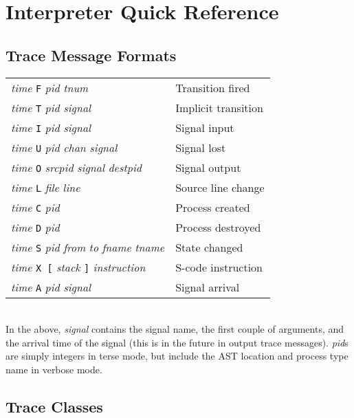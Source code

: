 \newpage
\section{Interpreter Quick Reference}

\subsection{Trace Message Formats}

\begin{tabular}{ll}
{\em time} {\tt F} {\em pid} {\em tnum} & Transition fired\\
{\em time} {\tt T} {\em pid} {\em signal} & Implicit transition\\
{\em time} {\tt I} {\em pid} {\em signal} & Signal input\\
{\em time} {\tt U} {\em pid} {\em chan} {\em signal} & Signal lost\\
{\em time} {\tt O} {\em srcpid} {\em signal} {\em destpid} & Signal output\\
{\em time} {\tt L} {\em file} {\em line} & Source line change\\
{\em time} {\tt C} {\em pid} & Process created\\
{\em time} {\tt D} {\em pid} & Process destroyed\\
{\em time} {\tt S} {\em pid} {\em from} {\em to} {\em fname} {\em tname}
& State changed\\
{\em time} {\tt X [} {\em stack} {\tt ]} {\em instruction} & S-code
instruction\\
{\em time} {\tt A} {\em pid} {\em signal} & Signal arrival\\
\end{tabular}\\

In the above, {\em signal} contains the signal name, the first couple
of arguments, and the arrival time of the signal (this is in the
future in output trace messages). {\em pid}s are simply integers
in terse mode, but include the AST location and process type name in
verbose mode.

\subsection{Trace Classes}

